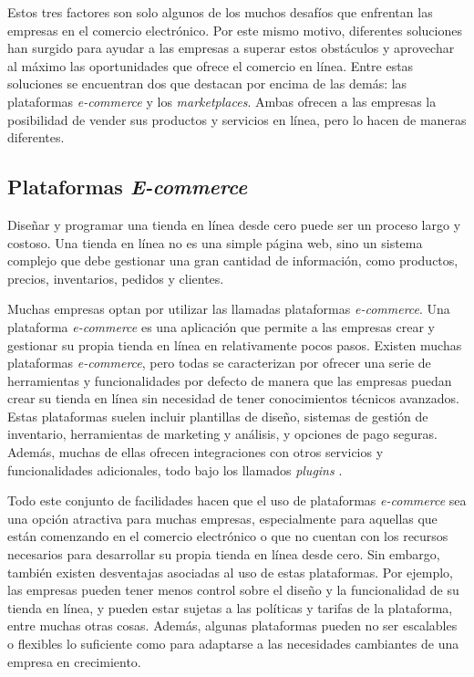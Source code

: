 Estos tres factores son solo algunos de los muchos desafíos que enfrentan las empresas en el comercio electrónico. Por este mismo motivo, diferentes soluciones han surgido para ayudar a las empresas a superar estos obstáculos y aprovechar al máximo las oportunidades que ofrece el comercio en línea. Entre estas soluciones se encuentran dos que destacan por encima de las demás: las plataformas \textit{e-commerce} y los \textit{marketplaces}. Ambas ofrecen a las empresas la posibilidad de vender sus productos y servicios en línea, pero lo hacen de maneras diferentes.

\subsection{Plataformas \textit{E-commerce}}

Diseñar y programar una tienda en línea desde cero puede ser un proceso largo y costoso. Una tienda en línea no es una simple página web, sino un sistema complejo que debe gestionar una gran cantidad de información, como productos, precios, inventarios, pedidos y clientes.

Muchas empresas optan por utilizar las llamadas plataformas \textit{e-commerce}. Una plataforma \textit{e-commerce} es una aplicación que permite a las empresas crear y gestionar su propia tienda en línea en relativamente pocos pasos. Existen muchas plataformas \textit{e-commerce}, pero todas se caracterizan por ofrecer una serie de herramientas y funcionalidades por defecto de manera que las empresas puedan crear su tienda en línea sin necesidad de tener conocimientos técnicos avanzados. Estas plataformas suelen incluir plantillas de diseño, sistemas de gestión de inventario, herramientas de marketing y análisis, y opciones de pago seguras. Además, muchas de ellas ofrecen integraciones con otros servicios y funcionalidades adicionales, todo bajo los llamados \textit{plugins} \cite{adobe_ecommerce_platforms}.

Todo este conjunto de facilidades hacen que el uso de plataformas \textit{e-commerce} sea una opción atractiva para muchas empresas, especialmente para aquellas que están comenzando en el comercio electrónico o que no cuentan con los recursos necesarios para desarrollar su propia tienda en línea desde cero. Sin embargo, también existen desventajas asociadas al uso de estas plataformas. Por ejemplo, las empresas pueden tener menos control sobre el diseño y la funcionalidad de su tienda en línea, y pueden estar sujetas a las políticas y tarifas de la plataforma, entre muchas otras cosas. Además, algunas plataformas pueden no ser escalables o flexibles lo suficiente como para adaptarse a las necesidades cambiantes de una empresa en crecimiento.


